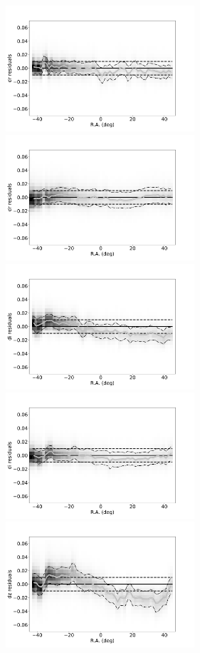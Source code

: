 \begin{figure}[th!]
    \centering\includegraphics[width=7cm]{figures/colorResidDES2bright_dr_RA_Hess.png}
    \centering\includegraphics[width=7cm]{figures/colorResidPSDR2bright_dr_RA_Hess.png}
    \centering\includegraphics[width=7cm]{figures/colorResidDES2bright_di_RA_Hess.png}
    \centering\includegraphics[width=7cm]{figures/colorResidPSDR2bright_di_RA_Hess.png}
    \centering\includegraphics[width=7cm]{figures/colorResidDES2bright_dz_RA_Hess.png}

\end{figure}
